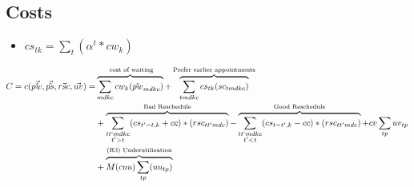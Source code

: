 \subsection{Costs}

\begin{itemize}
	\item $cs_{tk} = \sum_t (\alpha^t * cw_{k})$
\end{itemize}

\begin{equation}\begin{alignedat}{10}
		& C = c(\vec{\hat{pw}}, \vec{\hat{ps}}, \vec{rsc}, \vec{uv}) = 
		&& 
		\overbrace{ \sum_{mdkc} cw_{k} (\hat{pw}_{mdkc}) }^\text{
			cost of waiting}  + 
		\overbrace{
			\sum_{tmdkc} cs_{tk} (sc_{tmdkc})
		}^\text{Prefer earlier appointments} \\ 
		&	&&  +
		\overbrace{
			\sum_{
				\substack{tt`mdkc \\ t' > t}} 
			(cs_{t'-t, k} + cc) * (rsc_{tt'mdc})}^\text{Bad Reschedule} - 
		\overbrace{ 
			\sum_{
				\substack{tt`mdkc \\ t' < t}}
			(cs_{t-t', k} - cc) * (rsc_{tt'mdc})}^\text{Good Reschedule} + 
		cv \sum_{tp} uv_{tp} \\ 
		& && + \overbrace{
			M (cuu) \sum_{tp} (uu_{tp})}^\text{(R3) Underutilization}
\end{alignedat}\end{equation}